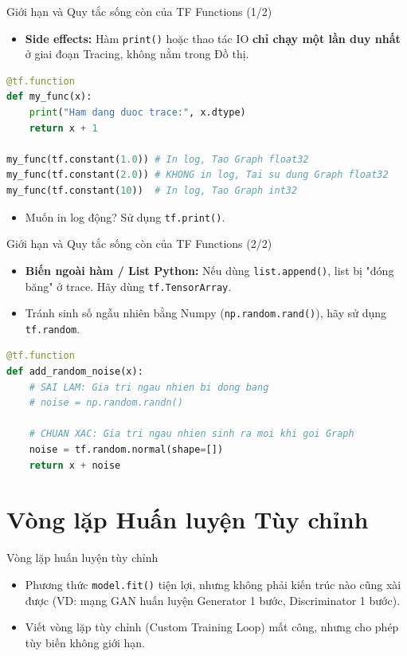 \documentclass[aspectratio=169]{beamer}
\begin{document}
\begin{frame}[fragile]{Giới hạn và Quy tắc sống còn của TF Functions (1/2)}
    \begin{itemize}
        \item \textbf{Side effects:} Hàm \texttt{print()} hoặc thao tác IO \textbf{chỉ chạy một lần duy nhất} ở giai đoạn Tracing, không nằm trong Đồ thị.
    \end{itemize}
    \begin{lstlisting}[language=Python]
@tf.function
def my_func(x):
    print("Ham dang duoc trace:", x.dtype)
    return x + 1

my_func(tf.constant(1.0)) # In log, Tao Graph float32
my_func(tf.constant(2.0)) # KHONG in log, Tai su dung Graph float32
my_func(tf.constant(10))  # In log, Tao Graph int32
    \end{lstlisting}
    \begin{itemize}
        \item Muốn in log động? Sử dụng \texttt{tf.print()}.
    \end{itemize}
\end{frame}

\begin{frame}[fragile]{Giới hạn và Quy tắc sống còn của TF Functions (2/2)}
    \begin{itemize}
        \item \textbf{Biến ngoài hàm / List Python:} Nếu dùng \texttt{list.append()}, list bị "đóng băng" ở trace. Hãy dùng \texttt{tf.TensorArray}.
        \item Tránh sinh số ngẫu nhiên bằng Numpy (\texttt{np.random.rand()}), hãy sử dụng \texttt{tf.random}.
    \end{itemize}
    \begin{lstlisting}[language=Python]
@tf.function
def add_random_noise(x):
    # SAI LAM: Gia tri ngau nhien bi dong bang
    # noise = np.random.randn()  
    
    # CHUAN XAC: Gia tri ngau nhien sinh ra moi khi goi Graph
    noise = tf.random.normal(shape=[])
    return x + noise
    \end{lstlisting}
\end{frame}

\section{Vòng lặp Huấn luyện Tùy chỉnh}

\begin{frame}{Vòng lặp huấn luyện tùy chỉnh}
    \begin{itemize}
        \item Phương thức \texttt{model.fit()} tiện lợi, nhưng không phải kiến trúc nào cũng xài được (VD: mạng GAN huấn luyện Generator 1 bước, Discriminator 1 bước).
        \item Viết vòng lặp tùy chỉnh (Custom Training Loop) mất công, nhưng cho phép tùy biến không giới hạn.
    \end{itemize}
\end{frame}
\end{document}
